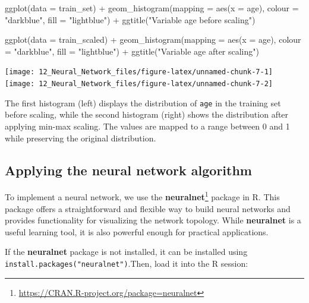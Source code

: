 \documentclass[
  11pt,
]{book}
\makeatletter
\newenvironment{Shaded}{}{}
\newcommand{\AttributeTok}[1]{#1}
\newcommand{\FunctionTok}[1]{#1}
\newcommand{\NormalTok}[1]{#1}
\newcommand{\SpecialCharTok}[1]{\textcolor[rgb]{0.39,0.39,0.39}{#1}}
\newcommand{\StringTok}[1]{\textcolor[rgb]{0.39,0.39,0.39}{#1}}
\renewcommand{\href}[2]{#2\footnote{\url{#1}}}
\newenvironment{kframe}{%
\medskip{}
\setlength{\fboxsep}{.8em}
 \def\at@end@of@kframe{}%
 \ifinner\ifhmode%
  \def\at@end@of@kframe{\end{minipage}}%
  \begin{minipage}{\columnwidth}%
 \fi\fi%
 \def\FrameCommand##1{\hskip\@totalleftmargin \hskip-\fboxsep
 \colorbox{shadecolor}{##1}\hskip-\fboxsep
     \hskip-\linewidth \hskip-\@totalleftmargin \hskip\columnwidth}%
 \MakeFramed {\advance\hsize-\width
   \@totalleftmargin\z@ \linewidth\hsize
   \@setminipage}}%
 {\par\unskip\endMakeFramed%
 \at@end@of@kframe}
\renewenvironment{Shaded}{\begin{kframe}}{\end{kframe}}
\theoremstyle{definition}
\theoremstyle{definition}
\theoremstyle{definition}
\theoremstyle{definition}
\theoremstyle{remark}
\makeatother
\begin{document}
\begin{Shaded}
\begin{Highlighting}[]
\FunctionTok{ggplot}\NormalTok{(}\AttributeTok{data =}\NormalTok{ train\_set) }\SpecialCharTok{+}
  \FunctionTok{geom\_histogram}\NormalTok{(}\AttributeTok{mapping =} \FunctionTok{aes}\NormalTok{(}\AttributeTok{x =}\NormalTok{ age), }\AttributeTok{colour =} \StringTok{"darkblue"}\NormalTok{, }\AttributeTok{fill =} \StringTok{"lightblue"}\NormalTok{) }\SpecialCharTok{+}
  \FunctionTok{ggtitle}\NormalTok{(}\StringTok{"Variable \textquotesingle{}age\textquotesingle{} before scaling"}\NormalTok{)}

\FunctionTok{ggplot}\NormalTok{(}\AttributeTok{data =}\NormalTok{ train\_scaled) }\SpecialCharTok{+}
  \FunctionTok{geom\_histogram}\NormalTok{(}\AttributeTok{mapping =} \FunctionTok{aes}\NormalTok{(}\AttributeTok{x =}\NormalTok{ age), }\AttributeTok{colour =} \StringTok{"darkblue"}\NormalTok{, }\AttributeTok{fill =} \StringTok{"lightblue"}\NormalTok{) }\SpecialCharTok{+}
  \FunctionTok{ggtitle}\NormalTok{(}\StringTok{"Variable \textquotesingle{}age\textquotesingle{} after scaling"}\NormalTok{)}
\end{Highlighting}
\end{Shaded}

\texttt{[image: 12\_Neural\_Network\_files/figure-latex/unnamed-chunk-7-1]} \texttt{[image: 12\_Neural\_Network\_files/figure-latex/unnamed-chunk-7-2]}

The first histogram (left) displays the distribution of \texttt{age} in the training set before scaling, while the second histogram (right) shows the distribution after applying min-max scaling. The values are mapped to a range between 0 and 1 while preserving the original distribution.

\subsection*{Applying the neural network algorithm}\label{applying-the-neural-network-algorithm}


To implement a neural network, we use the \href{https://CRAN.R-project.org/package=neuralnet}{\textbf{neuralnet}} package in R. This package offers a straightforward and flexible way to build neural networks and provides functionality for visualizing the network topology. While \textbf{neuralnet} is a useful learning tool, it is also powerful enough for practical applications.

If the \textbf{neuralnet} package is not installed, it can be installed using \texttt{install.packages("neuralnet")}.Then, load it into the R session:
\end{document}
